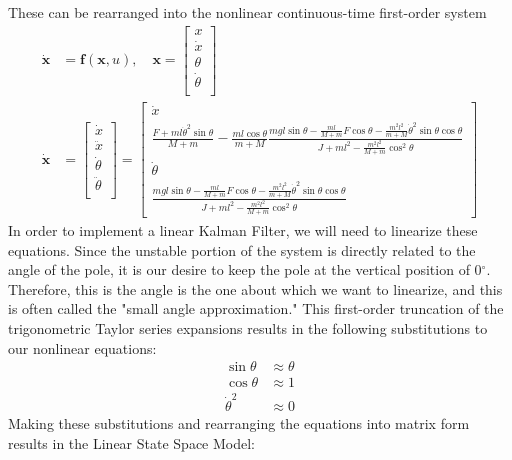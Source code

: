 \documentclass{article}
\newcommand{\matr}[1]{\bm{#1}}     %
\begin{document}
These can be rearranged into the nonlinear continuous-time first-order system
\begin{equation}
\begin{aligned}
\matr{\dot{x}} &= \matr{f}(\matr{x},u),\quad  \matr{x} = \begin{bmatrix}
	x \\
	\dot{x} \\
	\theta \\
	\dot{\theta} \\
\end{bmatrix} \\
\matr{\dot{x}} &= \begin{bmatrix}
	\dot{x} \\
	\ddot{x} \\
	\dot{\theta} \\
	\ddot{\theta} \\
\end{bmatrix} = \begin{bmatrix}
\dot{x} \\
\frac{F+ml\dot{\theta}^2\sin\theta}{M+m} -\frac{ml\cos\theta}{m+M}\frac{mgl\sin\theta- \frac{ml}{M+m} F\cos\theta -\frac{m^2l^2}{m+M}\dot{\theta}^2\sin\theta\cos\theta}{J+ml^2-\frac{m^2l^2}{M+m}\cos^2 \theta } \\[6pt]
\dot{\theta} \\
\frac{mgl\sin\theta - \frac{ml}{M+m} F\cos\theta -\frac{m^2l^2}{m+M}\dot{\theta}^2\sin\theta\cos\theta}{J+ml^2-\frac{m^2l^2}{M+m}\cos^2 \theta }
\end{bmatrix}
\end{aligned}
\end{equation}
In order to implement a linear Kalman Filter, we will need to linearize these equations. Since the unstable portion of the system is directly related to the angle of the pole, it is our desire to keep the pole at the vertical position of 0$^\circ$. Therefore, this is the angle is the one about which we want to linearize, and this is often called the "small angle approximation." This first-order truncation of the trigonometric Taylor series expansions results in the following substitutions to our nonlinear equations:
\begin{align*}
\sin \theta &\approx \theta \\
\cos \theta &\approx 1 \\
\dot{\theta}^2 &\approx 0
\end{align*}
Making these substitutions and rearranging the equations into matrix form results in the Linear State Space Model:
\end{document}
